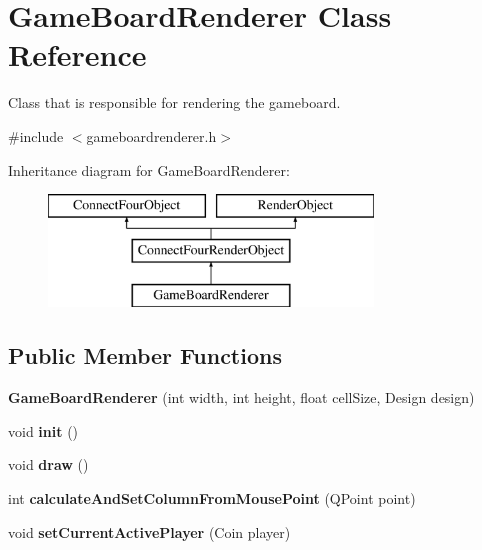 \hypertarget{class_game_board_renderer}{\section{Game\-Board\-Renderer Class Reference}
\label{class_game_board_renderer}
}


Class that is responsible for rendering the gameboard.  




{\ttfamily \#include $<$gameboardrenderer.\-h$>$}

Inheritance diagram for Game\-Board\-Renderer\-:\begin{figure}[H]
\begin{center}
\leavevmode
\includegraphics[height=3.000000cm]{class_game_board_renderer}
\end{center}
\end{figure}
\subsection*{Public Member Functions}
\begin{DoxyCompactItemize}
\item 
\hypertarget{class_game_board_renderer_a7bf3a6244010672355b3695fec8547c9}{{\bfseries Game\-Board\-Renderer} (int width, int height, float cell\-Size, Design design)}\label{class_game_board_renderer_a7bf3a6244010672355b3695fec8547c9}

\item 
\hypertarget{class_game_board_renderer_a5b45052cf71976461b07721195dd5dbe}{void {\bfseries init} ()}\label{class_game_board_renderer_a5b45052cf71976461b07721195dd5dbe}

\item 
\hypertarget{class_game_board_renderer_a9daf708f14cd6accf1e2f4cc54bb7d56}{void {\bfseries draw} ()}\label{class_game_board_renderer_a9daf708f14cd6accf1e2f4cc54bb7d56}

\item 
\hypertarget{class_game_board_renderer_a816b3c402bf466641681ed67cefe1041}{int {\bfseries calculate\-And\-Set\-Column\-From\-Mouse\-Point} (Q\-Point point)}\label{class_game_board_renderer_a816b3c402bf466641681ed67cefe1041}

\item 
\hypertarget{class_game_board_renderer_a5678cf7626743de3844406465ca2bf6f}{void {\bfseries set\-Current\-Active\-Player} (Coin player)}\label{class_game_board_renderer_a5678cf7626743de3844406465ca2bf6f}

\end{DoxyCompactItemize}
